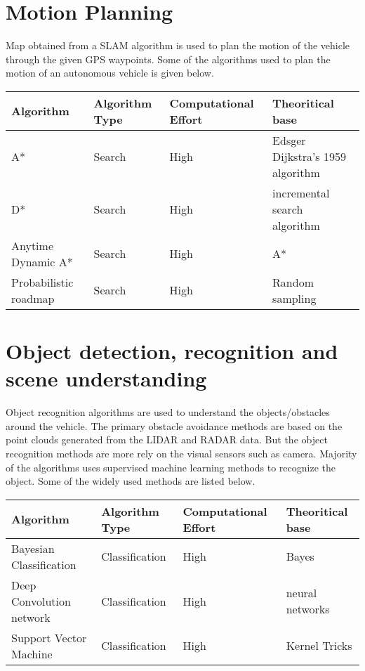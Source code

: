 \documentclass{article}
\begin{document}
\section{Motion Planning}

Map obtained from a SLAM algorithm is used to plan the motion of the vehicle through the given GPS waypoints. Some of the algorithms used to  plan the motion of an autonomous vehicle is given below.\\


\begin{tabular}{|p{3cm}|p{2cm}|p{3cm}|p{3cm}|}
\hline
Algorithm	&Algorithm Type	&Computational Effort	&Theoritical base\\
\hline
A* 	&Search	&High	& Edsger Dijkstra's 1959 algorithm\\
\hline
D*	& Search	&High	& incremental search algorithm\\
\hline
Anytime Dynamic A*	&Search	&High	&A*\\
\hline
 Probabilistic roadmap	&Search	&High	&Random sampling\\
\hline

\end{tabular}





\section{Object detection, recognition and scene understanding}
Object recognition algorithms are used to understand the objects/obstacles  around the vehicle. The primary obstacle avoidance methods are based on the point clouds generated from the LIDAR and RADAR data.  But the object recognition methods are more rely on the visual sensors such as camera. Majority of the algorithms uses supervised  machine learning methods to recognize the object. Some of the widely used methods are listed below.\\

\begin{tabular}{|p{3cm}|p{2cm}|p{3cm}|p{3cm}|}
\hline
Algorithm	&Algorithm Type	&Computational Effort	&Theoritical base\\
\hline
Bayesian Classification 	&Classification	&High	&Bayes\\
\hline
Deep Convolution network	&Classification	&High	&neural networks\\
\hline
Support Vector Machine	&Classification	&High	&Kernel Tricks\\
\hline

\end{tabular}
\end{document}
